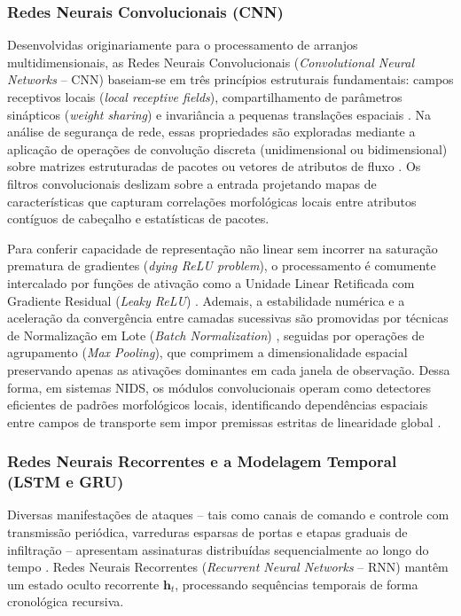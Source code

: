 \subsubsection{Redes Neurais Convolucionais (CNN)}

Desenvolvidas originariamente para o processamento de arranjos multidimensionais, as Redes Neurais Convolucionais (\emph{Convolutional Neural Networks} -- CNN) baseiam-se em três princípios estruturais fundamentais: campos receptivos locais (\emph{local receptive fields}), compartilhamento de parâmetros sinápticos (\emph{weight sharing}) e invariância a pequenas translações espaciais \cite{survey2025dl}. Na análise de segurança de rede, essas propriedades são exploradas mediante a aplicação de operações de convolução discreta (unidimensional ou bidimensional) sobre matrizes estruturadas de pacotes ou vetores de atributos de fluxo \cite{netflow2020}. Os filtros convolucionais deslizam sobre a entrada projetando mapas de características que capturam correlações morfológicas locais entre atributos contíguos de cabeçalho e estatísticas de pacotes.

Para conferir capacidade de representação não linear sem incorrer na saturação prematura de gradientes (\emph{dying ReLU problem}), o processamento é comumente intercalado por funções de ativação como a Unidade Linear Retificada com Gradiente Residual (\emph{Leaky ReLU}) \cite{survey2025dl}. Ademais, a estabilidade numérica e a aceleração da convergência entre camadas sucessivas são promovidas por técnicas de Normalização em Lote (\emph{Batch Normalization}) \cite{survey2025dl}, seguidas por operações de agrupamento (\emph{Max Pooling}), que comprimem a dimensionalidade espacial preservando apenas as ativações dominantes em cada janela de observação. Dessa forma, em sistemas NIDS, os módulos convolucionais operam como detectores eficientes de padrões morfológicos locais, identificando dependências espaciais entre campos de transporte sem impor premissas estritas de linearidade global \cite{survey2025dl, neuralcyber2025}.

\subsubsection{Redes Neurais Recorrentes e a Modelagem Temporal (LSTM e GRU)}

Diversas manifestações de ataques -- tais como canais de comando e controle com transmissão periódica, varreduras esparsas de portas e etapas graduais de infiltração -- apresentam assinaturas distribuídas sequencialmente ao longo do tempo \cite{temporal2025, timematters2025}. Redes Neurais Recorrentes (\emph{Recurrent Neural Networks} -- RNN) mantêm um estado oculto recorrente $\mathbf{h}_t$, processando sequências temporais de forma cronológica recursiva.

